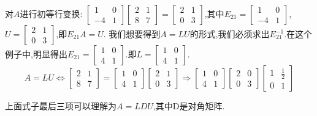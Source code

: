 \documentclass[oneside]{book}
\begin{document}
	对$ A $进行初等行变换:
	$\left[\begin{array}{cc}
		1 & 0\\
		-4 & 1
	\end{array}\right]
	\left[\begin{array}{cc}
		2 & 1\\
		8 & 7
	\end{array}\right] 
	=
	\left[\begin{array}{cc}
		2 & 1\\
		0 & 3
	\end{array}\right] $,其中$ E_{21}=\left[\begin{array}{cc}
	1 & 0\\
	-4 & 1
\end{array}\right] $,$ U=\left[\begin{array}{cc}
2 & 1\\
0 & 3
\end{array}\right] $,即$ E_{21}A=U $.
我们想要得到$ A=LU $的形式,我们必须求出$ E_{21}^{-1} $.在这个例子中,明显得出$ E_{21}=\left[\begin{array}{cc}
	1 & 0\\
	4 & 1
\end{array}\right] $.即$ L=\left[\begin{array}{cc}
1 & 0\\
4 & 1
\end{array}\right] $.
$$A=LU \Leftrightarrow \left[\begin{array}{cc}
	2 & 1\\
	8 & 7
\end{array}\right]=\left[\begin{array}{cc}
1 & 0\\
4 & 1
\end{array}\right]\left[\begin{array}{cc}
2 & 1\\
0 & 3
\end{array}\right] \Rightarrow \left[\begin{array}{cc}
1 & 0\\
4 & 1
\end{array}\right]\left[\begin{array}{cc}
2 & 0\\
0 & 3
\end{array}\right]\left[\begin{array}{cc}
1 & \frac{1}{2}\\
0 & 1
\end{array}\right]$$

上面式子最后三项可以理解为$ A=LDU $,其中D是对角矩阵.
\end{document}
